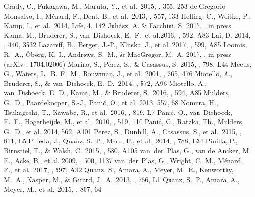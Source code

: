 \documentclass[onecolumn]{aastex6}
\begin{document}
\begin{thebibliography}{}
 Grady, C., Fukagawa, M., Maruta, Y., et al.~2015, \apss, 355, 253
 de Gregorio Monsalvo, I., M\'{e}nard, F., Dent, B., et al.~2013, \aap, 557, 133
 Helling, C., Woitke, P., Kamp, I., et al.~2014, Life, 4, 142
 Juh\'{a}sz, A. \& Facchini, S. 2017, \mnras, in press
 Kama, M., Bruderer, S., van~Dishoeck, E.~F., et al.2016, \aap, 592, A83
 Lai, D. 2014, \mnras, 440, 3532
 Lazareff, B., Berger, J.-P., Kluska, J., et al. 2017, \aap, 599, A85
 Loomis, R.~A., \"{O}berg, K.~I., Andrews, S.~M., \& MacGregor, M.~A. 2017, \apj, in press (arXiv : 1704.02006)
 Marino, S., P\'{e}rez, S., \& Casassus, S. 2015, \apjl,  798, L44 
 Meeus, G., Waters, L.~B.~F.~M., Bouwman, J., et al.~2001, \aap, 365, 476 
 Miotello, A., Bruderer, S., \& van~Dishoeck, E.~D.~2014, \aap, 572, A96
 Miotello, A., van~Dishoeck, E.~D., Kama, M., \& Bruderer, S.~2016, \aap, 594, A85 
 Mulders, G.~D., Paardekooper, S.-J., Pani\'{c}, O., et al. 2013, 557, 68
 Nomura, H., Tsukagoshi, T., Kawabe, R., et al.~2016, \apjl, 819, L7
 Pani\'{c}, O., van~Dishoeck, E.~F., Hogerheijde, M., et al.~2010, \aap, 519, 110
 Pani\'{c}, O., Ratzka, Th., Mulders, G.~D., et al. 2014, 562, A101
 Perez, S., Dunhill, A., Casassus, S., et al.~2015, \apj, 811, L5
 Pineda, J., Quanz, S.~P., Meru, F., et al.~2014, \apjl, 788, L34  
 Pinilla, P., Birnstiel, T., \& Walsh, C.~2015, \aap, 580, A105
 van~der~Plas, G., van de Ancker, M. E., Acke, B., et al. 2009, \aap, 500, 1137 
  van~der~Plas, G., Wright, C.~M., M\'{e}nard, F., et al.~2017, \aap, 597, A32
 Quanz, S., Amara, A., Meyer, M.~R., Kenworthy, M.~A., Kasper, M., \& Girard, J.~A.~2013, \apjl, 766, L1
 Quanz, S.~P., Amara, A., Meyer, M., et al.~2015, \apj, 807, 64   

\end{thebibliography}
\end{document}
